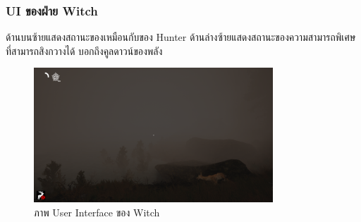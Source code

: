 \subsubsection{UI ของฝ่าย Witch}

ด้านบนซ้ายแสดงสถานะของเหมือนกับของ Hunter ด้านล่างซ้ายแสดงสถานะของความสามารถพิเศษที่สามารถสิงกวางได้ บอกถึงคูลดาวน์ของพลัง

\begin{figure}[h]
  \begin{center}
  \includegraphics[width=0.8\textwidth]{./img/UI/witch_ui.png}
  \end{center}
  \caption[ภาพ User Interface ของ Witch]{ภาพ User Interface ของ Witch}
  \label{fig:witch_ui}
\end{figure}